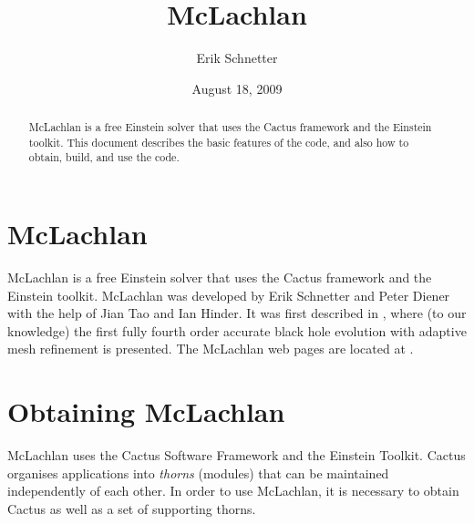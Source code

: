 \documentclass[11pt, tightenlines]{revtex4}
\newcommand{\todo}[1]{{\color{blue}$\blacksquare$~\textsf{[TODO: #1]}}}
\begin{document}
\title{McLachlan}
\date{August 18, 2009}

\author{Erik Schnetter}
\address{Center for Computation \& Technology, Louisiana State
  University, USA}

\begin{abstract}
  McLachlan is a free Einstein solver that uses the Cactus framework
  and the Einstein toolkit.  This document describes the basic
  features of the code, and also how to obtain, build, and use the
  code.
\end{abstract}

\maketitle



\section{McLachlan}

McLachlan is a free Einstein solver that uses the Cactus framework and
the Einstein toolkit.  McLachlan was developed by Erik Schnetter and
Peter Diener with the help of Jian Tao and Ian Hinder.  It was first
described in \cite{ES-Brown2007b}, where (to our knowledge) the first
fully fourth order accurate black hole evolution with adaptive mesh
refinement is presented.  The McLachlan web pages are located at
\cite{ES-mclachlanweb}.



% 



% 



\section{Obtaining McLachlan}

McLachlan uses the Cactus Software Framework and the Einstein Toolkit.
Cactus organises applications into \emph{thorns} (modules) that can be
maintained independently of each other.  In order to use McLachlan, it
is necessary to obtain Cactus as well as a set of supporting thorns.
\end{document}
